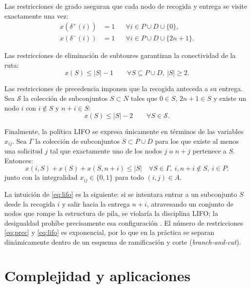 \documentclass[conference]{IEEEtran}
\begin{document}
Las restricciones de grado aseguran que cada nodo de recogida y entrega se visite exactamente una vez:
\begin{align}
x(\delta^{+}(i)) &= 1 && \forall i\in P\cup D\cup\{0\}, \label{eq:out}\\
x(\delta^{-}(i)) &= 1 && \forall i\in P\cup D\cup\{2n+1\}. \label{eq:in}
\end{align}

Las restricciones de eliminación de subtoures garantizan la conectividad de la ruta:
\begin{equation}
x(S) \le |S|-1 \qquad \forall S\subseteq P\cup D,\ |S|\ge 2. \label{eq:subtour}
\end{equation}

Las restricciones de precedencia imponen que la recogida anteceda a su entrega. Sea $\mathcal{S}$ la colección de subconjuntos $S\subset N$ tales que $0\in S$, $2n+1\in S$ y existe un nodo $i$ con $i\notin S$ y $n+i\in S$:
\begin{equation}
x(S) \le |S|-2 \qquad \forall S\in \mathcal{S}. \label{eq:prec}
\end{equation}

Finalmente, la política LIFO se expresa únicamente en términos de las variables $x_{ij}$. Sea $\Gamma$ la colección de subconjuntos $S\subset P\cup D$ para los que existe al menos una solicitud $j$ tal que exactamente uno de los nodos $j$ o $n+j$ pertenece a $S$. Entonces:
\begin{equation}
x(i,S)+x(S)+x(S,n+i) \le |S| \quad \forall S\in\Gamma,\ i,n+i\notin S,\ i\in P. \label{eq:lifo}
\end{equation}
junto con la integralidad $x_{ij}\in\{0,1\}$ para todo $(i,j)\in A$.

La intuición de \eqref{eq:lifo} es la siguiente: si se intentara entrar a un subconjunto $S$ desde la recogida $i$ y salir hacia la entrega $n+i$, atravesando un conjunto de nodos que rompe la estructura de pila, se violaría la disciplina LIFO; la desigualdad prohíbe precisamente esa configuración \cite{cordeau2010}. El número de restricciones \eqref{eq:prec} y \eqref{eq:lifo} es exponencial, por lo que en la práctica se separan dinámicamente dentro de un esquema de ramificación y corte (\textit{branch-and-cut}).

\section{Complejidad y aplicaciones}\label{sec:comp}
\end{document}
